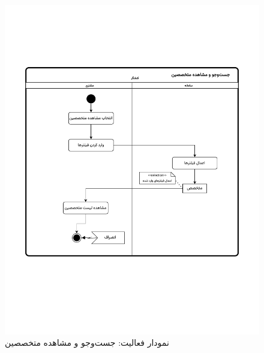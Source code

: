 \begin{figure}[ht!]
	\centering
	\includegraphics[scale=0.8, page=1]{figs/OOD-activity-searchspec.pdf}
	\caption{نمودار فعالیت: جست‌وجو و مشاهده متخصصین}
\end{figure}
\FloatBarrier
\newpage

